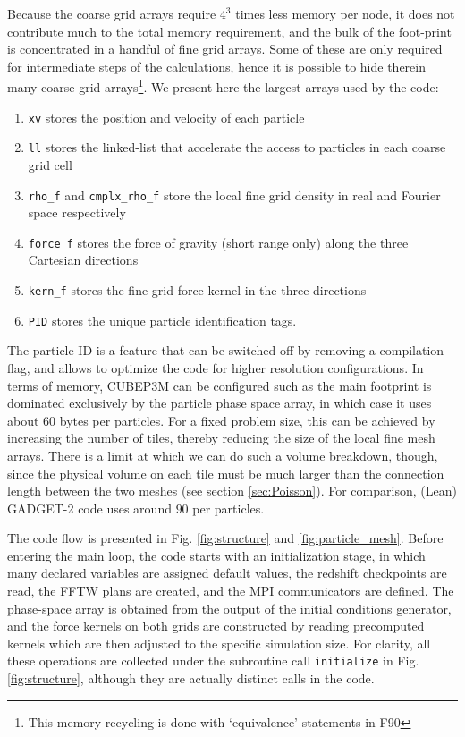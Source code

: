 \documentclass[useAMS,usenatbib]{mn2e}
\begin{document}
Because the coarse grid arrays require $4^3$ times less memory per node, 
it does not contribute much to the total memory requirement, and the bulk of the foot-print is 
concentrated in a handful of fine grid arrays.
Some of these are only required for intermediate steps of the calculations, 
hence it is possible to hide therein many coarse grid arrays\footnote{ This memory recycling is done with `equivalence' statements in {\small F90}}.   
We present here the largest arrays used by the code:
\begin{enumerate}
\item{{\tt xv} stores the position and velocity of each particle} 
\item{{\tt ll} stores the linked-list that accelerate the access to particles in each coarse grid cell}
\item{{\tt rho\_f} and {\tt cmplx\_rho\_f} store 
the local fine grid density  in real and Fourier space respectively}
\item{{\tt force\_f} stores the force of gravity (short range only) along the three Cartesian directions}
\item{{\tt kern\_f} stores the fine grid force kernel in the three directions}
\item{{\tt PID} stores the unique particle identification tags.}
\end{enumerate}
The particle ID is a feature that can be switched off by removing a compilation flag, 
and allows to optimize the code for higher resolution configurations.
In terms of memory, {\small CUBEP3M} can be configured such as the main footprint is dominated exclusively by the 
particle phase space array, in which case it uses about $60$ bytes per particles. 
For a fixed problem size, this can be achieved by increasing the number of tiles, thereby reducing the size of the local fine mesh arrays.
There is a limit at which we can do such a volume breakdown, though, since the physical 
volume on each tile must be much larger than the connection length between the two meshes (see section \ref{sec:Poisson}).
%
For comparison, (Lean) {\small GADGET-2} code uses around $90$ per particles.

The code flow is presented in Fig. \ref{fig:structure} and \ref{fig:particle_mesh}.
Before entering the main loop, the code starts with an initialization stage, 
in which many declared variables are assigned default values,
the redshift checkpoints are read, the {\small FFTW} plans are created, and the {\small MPI} communicators are defined.
The phase-space array  is obtained from the output of the initial conditions generator,
and the force kernels on both grids are constructed by reading precomputed kernels which are then adjusted to the specific simulation size.
For clarity, all these operations are collected under the subroutine call {\tt initialize} in Fig. \ref{fig:structure}, 
although they are actually distinct calls in the code.
\end{document}
